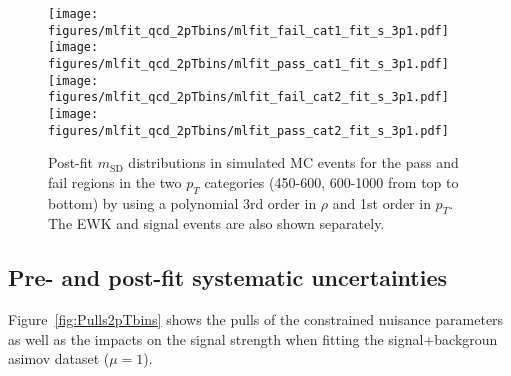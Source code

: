 
\begin{figure}[hbtp]
\centering
\texttt{[image: figures/mlfit\_qcd\_2pTbins/mlfit\_fail\_cat1\_fit\_s\_3p1.pdf]}
\texttt{[image: figures/mlfit\_qcd\_2pTbins/mlfit\_pass\_cat1\_fit\_s\_3p1.pdf]}\\
\texttt{[image: figures/mlfit\_qcd\_2pTbins/mlfit\_fail\_cat2\_fit\_s\_3p1.pdf]}
\texttt{[image: figures/mlfit\_qcd\_2pTbins/mlfit\_pass\_cat2\_fit\_s\_3p1.pdf]}
 \caption{Post-fit $m_\mathrm{SD}$ distributions in simulated MC events for the pass and fail regions in the two $p_{T}$ categories (450-600, 600-1000 from top to bottom) by using a polynomial 3rd order in $\rho$ and 1st order in $p_{T}$. The EWK and signal events are also shown separately.}
 \label{fig:mlfit2pTbinsMC}
 \end{figure}

\subsection{Pre- and post-fit systematic uncertainties}
Figure~\ref{fig:Pulls2pTbins} shows the pulls of the constrained nuisance parameters as well as the impacts on the signal strength when fitting the signal+backgroun asimov dataset ($\mu=1$).

